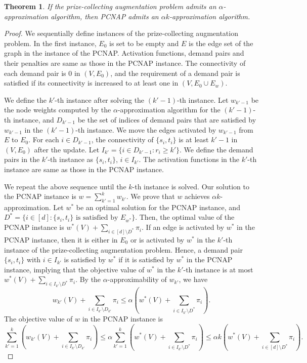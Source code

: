 \documentclass[11pt]{article}
\newtheorem{theorem}{Theorem}
\begin{document}
\begin{theorem}\label{thm.augmentation}
 If the prize-collecting augmentation problem admits an
 $\alpha$-approximation algorithm, then PCNAP admits an $\alpha
 k$-approximation algorithm.
\end{theorem}
\begin{proof}
 We sequentially define instances of the prize-collecting augmentation
 problem. In the first instance,
 $E_0$ is set to be empty and $E$ is the edge set of the graph in the
 instance of the PCNAP. 
 Activation functions, demand pairs and their penalties are same as
 those in the PCNAP instance.
 The connectivity of each demand pair is $0$ in $(V,E_0)$,
 and the requirement of a demand pair is satisfied 
 if its connectivity is increased to at least one in $(V,E_0 \cup E_w)$.
 
 We define the $k'$-th instance after solving the $(k'-1)$-th instance.
 Let $w_{k'-1}$ be the node weights computed by the
 $\alpha$-approximation algorithm for the $(k'-1)$-th instance,
 and $D_{k'-1}$ be the set of indices of demand pairs that are
 satisfied by $w_{k'-1}$ in the $(k'-1)$-th instance.
 We move the edges activated by $w_{k'-1}$ from $E$ to $E_0$.
 For each $i \in D_{k'-1}$, the connectivity of $\{s_i,t_i\}$  is at least
 $k'-1$ in $(V,E_0)$ after the update.
 Let $I_{k'}=\{i \in D_{k'-1}\colon r_{i}\geq k'\}$.
 We define the demand pairs in the $k'$-th instance as $\{s_i,t_i\}$,
 $i\in I_{k'}$.
 The activation functions in the $k'$-th instance 
 are same as those in the PCNAP instance.

 We repeat the above sequence until the $k$-th instance is solved.
 Our solution to the PCNAP instance is $w=\sum_{k'=1}^k w_{k'}$.
 We prove that $w$ achieves $\alpha k$-approximation.
 Let $w^*$ be an optimal solution for the PCNAP instance, and $D^*=\{i
 \in [d] \colon \mbox{$\{s_i,t_i\}$ is satisfied by $E_{w^*}$}\}$.
 Then,
 the optimal value of the PCNAP instance is 
 $w^*(V) + \sum_{i \in [d]\setminus D^*}\pi_i$.
 If an edge is activated by $w^*$ in the PCNAP instance,
 then it is either in $E_0$ or is activated by $w^*$ in the $k'$-th
 instance of the prize-collecting augmentation problem.
 Hence, a demand pair $\{s_i,t_i\}$ with $i \in I_{k'}$
 is satisfied by $w^*$ if it is satisfied by $w^*$ in the PCNAP instance,
 implying that
 the objective value of $w^*$ 
 in the $k'$-th instance
 is at most $w^*(V) + \sum_{i \in I_{k'}\setminus D^*}\pi_i$.
 By the $\alpha$-approximability of $w_{k'}$,
 we have
\[
 w_{k'}(V) + \sum_{i \in I_{k'}\setminus D_{k'}}\pi_i \leq \alpha \left(w^*(V) + \sum_{i \in I_{k'}\setminus D^*}\pi_i\right).
\]
The objective value of $w$ in the PCNAP instance is 
\[
 \sum_{k'=1}^k \left(w_{k'}(V) + \sum_{i \in I_{k'}\setminus D_{k'}}\pi_i\right)
\leq 
 \alpha \sum_{k'=1}^k\left(w^*(V) + \sum_{i \in I_{k'}\setminus D^*}\pi_i\right)
\leq 
 \alpha k \left(w^*(V) + \sum_{i \in [d]\setminus D^*}\pi_i\right).
\]
\end{proof}
\end{document}
